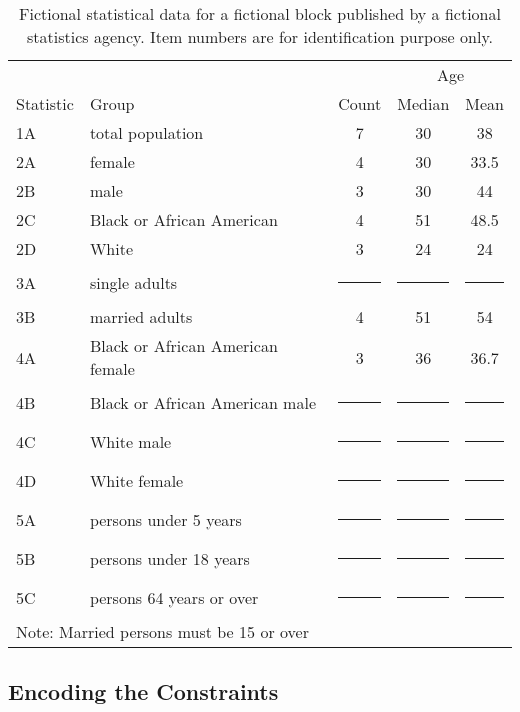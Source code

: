\documentclass[runningheads]{llncs}
\begin{document}
\newcommand{\cens}{\multicolumn{1}{c|}{\rule{6mm}{3mm}}}
\begin{table}
\caption{Fictional statistical data for a fictional block published by
  a fictional statistics agency. Item numbers are for identification
  purpose only.\label{fictional}}
\begin{center}
\begin{tabular}{l|l|c|c|c|}
          &                           &       & \multicolumn{2}{|c|}{Age} \\
Statistic & Group                     & Count & Median & Mean \\
\hline
       1A & total population          & 7     &  30    & 38 \\
\hline
       2A & female                    & 4     &  30    & 33.5 \\
       2B & male                      & 3     &  30    & 44 \\
       2C & Black or African American & 4     &  51    & 48.5 \\
       2D & White                     & 3     &  24    & 24 \\
\hline
       3A & single adults             & \cens & \cens  & \cens \\
       3B & married adults            & 4     & 51     & 54 \\
\hline
       4A & Black or African American female              & 3     & 36     & 36.7 \\
       4B & Black or African American male                & \cens & \cens  & \cens \\
       4C & White male                & \cens & \cens  & \cens \\
       4D & White female              & \cens & \cens  & \cens \\
\hline
       5A & persons under 5 years     & \cens & \cens  & \cens \\
       5B & persons under 18 years    & \cens & \cens  & \cens \\
       5C & persons 64 years or over  & \cens & \cens  & \cens \\
\hline
\multicolumn{5}{l}{Note: Married persons must be 15 or over}
\end{tabular}
\end{center}
\end{table}

\subsection{Encoding the Constraints}
\end{document}

